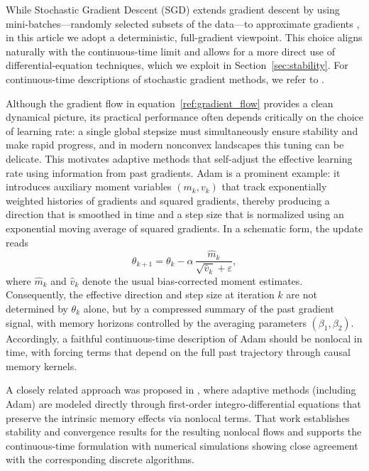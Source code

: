 \documentclass{article} %
\def\eqref#1{equation~\ref{#1}}
\begin{document}
While Stochastic Gradient Descent (SGD) extends gradient descent by using mini-batches---randomly selected subsets of the data---to approximate gradients \citep{Bottou2010}, in this article we adopt a deterministic, full-gradient viewpoint. This choice aligns naturally with the continuous-time limit and allows for a more direct use of differential-equation techniques, which we exploit in Section~\ref{sec:stability}. For continuous-time descriptions of stochastic gradient methods, we refer to \citet{sirignano2017stochastic, lugosi2025}.

Although the gradient flow in \eqref{ref:gradient_flow} provides a clean dynamical picture, its practical performance often depends critically on the choice of learning rate: a single global stepsize must simultaneously ensure stability and make rapid progress, and in modern nonconvex landscapes this tuning can be delicate. This motivates adaptive methods that self-adjust the effective learning rate using information from past gradients. Adam is a prominent example: it introduces auxiliary moment variables $(m_k,v_k)$ that track exponentially weighted histories of gradients and squared gradients, thereby producing a direction that is smoothed in time and a step size that is normalized using an exponential moving average of squared gradients. In a schematic form, the update reads
\[
\theta_{k+1}
=\theta_k-\alpha\,\frac{\widehat m_k}{\sqrt{\widehat v_k}+\varepsilon},
\]
where $\widehat m_k$ and $\widehat v_k$ denote the usual bias-corrected moment estimates.
Consequently, the effective direction and step size at iteration $k$ are not determined by $\theta_k$ alone, but by a compressed summary of the past gradient signal, with memory horizons controlled by the averaging parameters $(\beta_1,\beta_2)$. Accordingly, a faithful continuous-time description of Adam should be nonlocal in time, with forcing terms that depend on the full past trajectory through causal memory kernels.

A closely related approach was proposed in \cite{heredia2025modelingadagradrmspropadam}, where adaptive methods (including Adam) are modeled directly through first-order integro-differential equations that preserve the intrinsic memory effects via nonlocal terms. That work establishes stability and convergence results for the resulting nonlocal flows and supports the continuous-time formulation with numerical simulations showing close agreement with the corresponding discrete algorithms.
\end{document}
